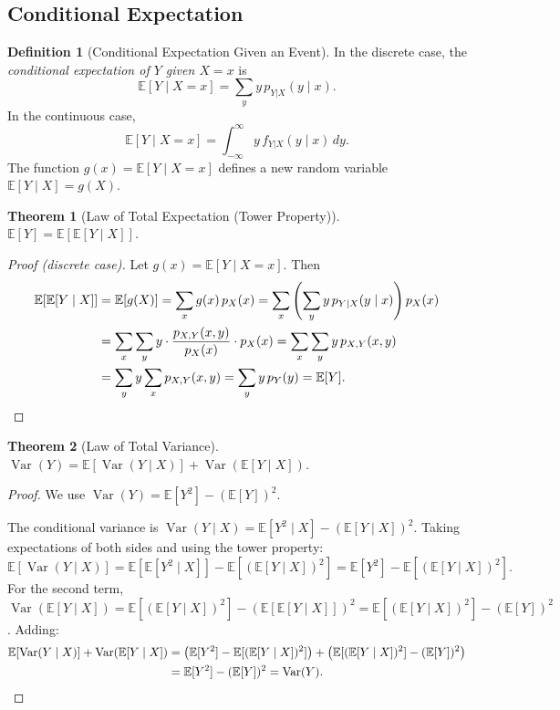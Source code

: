 \documentclass[11pt,a4paper]{article}
\theoremstyle{definition}
\newtheorem{definition}{Definition}[section]
\theoremstyle{plain}
\newtheorem{theorem}{Theorem}[section]
\theoremstyle{remark}
\newcommand{\E}{\mathbb{E}}
\DeclareMathOperator{\Var}{Var}
\begin{document}
\subsection{Conditional Expectation}

\begin{definition}[Conditional Expectation Given an Event]
\label{def:cond_exp}
In the discrete case, the \emph{conditional expectation of $Y$ given $X = x$} is
\[
    \E[Y \mid X = x] = \sum_y y \, p_{Y|X}(y \mid x).
\]
In the continuous case,
\[
    \E[Y \mid X = x] = \int_{-\infty}^\infty y \, f_{Y|X}(y \mid x)\,dy.
\]
The function $g(x) = \E[Y \mid X = x]$ defines a new random variable $\E[Y \mid X] = g(X)$.
\end{definition}

\begin{theorem}[Law of Total Expectation (Tower Property)]
\label{thm:total_expectation}
$\E[Y] = \E\!\left[\E[Y \mid X]\right]$.
\end{theorem}

\begin{proof}[Proof (discrete case)]
Let $g(x) = \E[Y \mid X = x]$. Then
\begin{align*}
    \E[\E[Y \mid X]] &= \E[g(X)] = \sum_x g(x)\,p_X(x)
    = \sum_x \left(\sum_y y\,p_{Y|X}(y \mid x)\right) p_X(x) \\
    &= \sum_x \sum_y y \cdot \frac{p_{X,Y}(x,y)}{p_X(x)} \cdot p_X(x)
    = \sum_x \sum_y y\,p_{X,Y}(x,y) \\
    &= \sum_y y \sum_x p_{X,Y}(x,y) = \sum_y y\,p_Y(y) = \E[Y].
    \qedhere
\end{align*}
\end{proof}

\begin{theorem}[Law of Total Variance]
\label{thm:total_variance}
$\Var(Y) = \E[\Var(Y \mid X)] + \Var(\E[Y \mid X])$.
\end{theorem}

\begin{proof}
We use $\Var(Y) = \E[Y^2] - (\E[Y])^2$.

The conditional variance is $\Var(Y \mid X) = \E[Y^2 \mid X] - (\E[Y \mid X])^2$.
Taking expectations of both sides and using the tower property:
\[
    \E[\Var(Y \mid X)] = \E[\E[Y^2 \mid X]] - \E[(\E[Y \mid X])^2]
    = \E[Y^2] - \E[(\E[Y \mid X])^2].
\]
For the second term, $\Var(\E[Y \mid X]) = \E[(\E[Y \mid X])^2] - (\E[\E[Y \mid X]])^2
= \E[(\E[Y \mid X])^2] - (\E[Y])^2$.
Adding:
\begin{align*}
    \E[\Var(Y \mid X)] + \Var(\E[Y \mid X])
    &= \left(\E[Y^2] - \E[(\E[Y \mid X])^2]\right) + \left(\E[(\E[Y \mid X])^2] - (\E[Y])^2\right) \\
    &= \E[Y^2] - (\E[Y])^2 = \Var(Y).
    \qedhere
\end{align*}
\end{proof}
\end{document}
